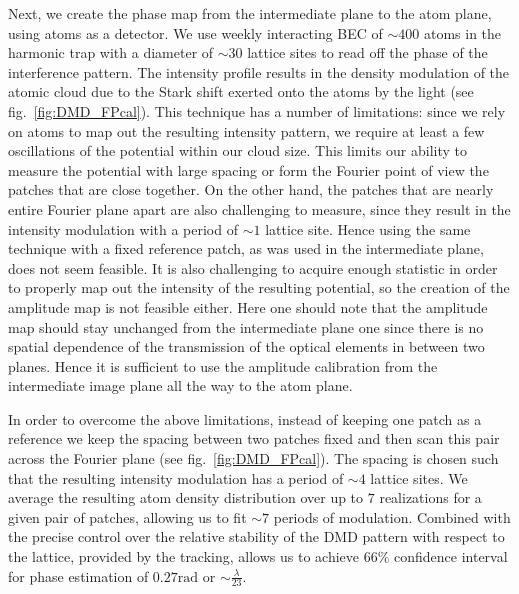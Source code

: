 Next, we create the phase map from the intermediate plane to the atom plane, using atoms as a detector. We use weekly interacting BEC of $\sim 400$ atoms in the harmonic trap with a diameter of $\sim 30$ lattice sites to read off the phase of the interference pattern. The intensity profile results in the density modulation of the atomic cloud due to the Stark shift exerted onto the atoms by the light (see fig.~\ref{fig:DMD_FPcal}). This technique has a number of limitations: since we rely on atoms to map out the resulting intensity pattern, we require at least a few oscillations of the potential within our cloud size. This limits our ability to measure the potential with large spacing or form the Fourier point of view the patches that are close together. On the other hand, the patches that are nearly entire Fourier plane apart are also challenging to measure, since they result in the intensity modulation with a period of $\sim 1$ lattice site. Hence using the same technique with a fixed reference patch, as was used in the intermediate plane, does not seem feasible. It is also challenging to acquire enough statistic in order to properly map out the intensity of the resulting potential, so the creation of the amplitude map is not feasible either. Here one should note that the amplitude map should stay unchanged from the intermediate plane one since there is no spatial dependence of the transmission of the optical elements in between two planes. Hence it is sufficient to use the amplitude calibration from the intermediate image plane all the way to the atom plane.

In order to overcome the above limitations, instead of keeping one patch as a reference we keep the spacing between two patches fixed and then scan this pair across the Fourier plane (see fig.~\ref{fig:DMD_FPcal}). The spacing is chosen such that the resulting intensity modulation has a period of $\sim 4$ lattice sites. We average the resulting atom density distribution over up to $7$ realizations for a given pair of patches, allowing us to fit $\sim 7$ periods of modulation. Combined with the precise control over the relative stability of the DMD pattern with respect to the lattice, provided by the tracking, allows us to achieve $66\%$ confidence interval for phase estimation of $0.27 \mathrm{rad}$ or $\sim \frac{\lambda}{23}$. 


